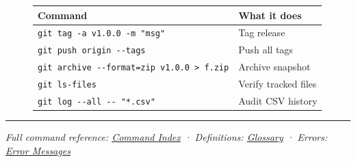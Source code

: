 \documentclass[
  9pt,
  a4paper,
  DIV=11,
  numbers=noendperiod]{scrartcl}
\begin{document}
\begin{figure}
\begin{minipage}{0.50\linewidth}
\begin{longtable}[]{@{}ll@{}}
\toprule\noalign{}
Command & What it does \\
\midrule\noalign{}
\endhead
\bottomrule\noalign{}
\endlastfoot
\texttt{git\ tag\ -a\ v1.0.0\ -m\ "msg"} & Tag release \\
\texttt{git\ push\ origin\ -\/-tags} & Push all tags \\
\texttt{git\ archive\ -\/-format=zip\ v1.0.0\ \textgreater{}\ f.zip} &
Archive snapshot \\
\texttt{git\ ls-files} & Verify tracked files \\
\texttt{git\ log\ -\/-all\ -\/-\ "*.csv"} & Audit CSV history \\
\end{longtable}

\end{minipage}%

\end{figure}%

\begin{center}\rule{0.5\linewidth}{0.5pt}\end{center}

\emph{Full command reference: \href{command-index.qmd}{Command Index} ·
Definitions: \href{glossary.qmd}{Glossary} · Errors:
\href{error-messages.qmd}{Error Messages}}
\end{document}
